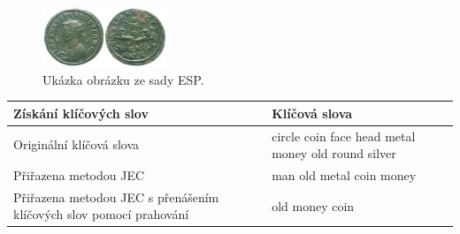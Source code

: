 \documentclass[czech,BP]{thesiskiv}
\begin{document}
\begin{figure}[H]
	\centering
	\includegraphics[width=140px]{./img/esp_86743.jpg}	
	\caption{Ukázka obrázku ze sady ESP.}
	\label{img:esp_coin}
\end{figure}

\begin{center}
	\begin{tabular}{| p{7cm} | p{7cm} |}
		\hline
		\textbf{Získání klíčových slov} & \textbf{Klíčová slova} \\ \hline
		Originální klíčová slova & circle coin face head metal money old round silver \\ \hline
		Přiřazena metodou JEC & man old metal coin money \\ \hline
		Přiřazena metodou JEC s přenášením klíčových slov pomocí prahování & old money coin \\ \hline 	
	\end{tabular}
\end{center}
	 
\end{document}

